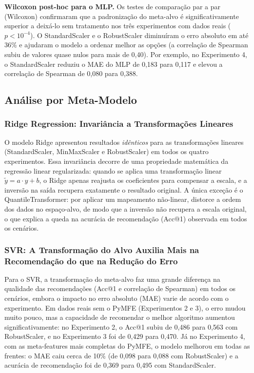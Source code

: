 \documentclass[12pt]{article}
\begin{document}
\textbf{Wilcoxon post-hoc para o MLP.} Os testes de comparação par a par (Wilcoxon) confirmaram que a padronização do meta-alvo é significativamente superior a deixá-lo sem tratamento nos três experimentos com dados reais ($p < 10^{-4}$). O StandardScaler e o RobustScaler diminuíram o erro absoluto em até 36\% e ajudaram o modelo a ordenar melhor as opções (a correlação de Spearman subiu de valores quase nulos para mais de 0,40). Por exemplo, no Experimento 4, o StandardScaler reduziu o MAE do MLP de 0,183 para 0,117 e elevou a correlação de Spearman de 0,080 para 0,388.

\subsection{Análise por Meta-Modelo}

\subsubsection{Ridge Regression: Invariância a Transformações Lineares}

O modelo Ridge apresentou resultados \textit{idênticos} para as transformações lineares (StandardScaler, MinMaxScaler e RobustScaler) em todos os quatro experimentos. Essa invariância decorre de uma propriedade matemática da regressão linear regularizada: quando se aplica uma transformação linear $\tilde{y} = a \cdot y + b$, o Ridge apenas reajusta os coeficientes para compensar a escala, e a inversão na saída recupera exatamente o resultado original. A única exceção é o QuantileTransformer: por aplicar um mapeamento não-linear, distorce a ordem dos dados no espaço-alvo, de modo que a inversão não recupera a escala original, o que explica a queda na acurácia de recomendação (Acc@1) observada em todos os cenários.

\subsubsection{SVR: A Transformação do Alvo Auxilia Mais na Recomendação do que na Redução do Erro}

Para o SVR, a transformação do meta-alvo faz uma grande diferença na qualidade das recomendações (Acc@1 e correlação de Spearman) em todos os cenários, embora o impacto no erro absoluto (MAE) varie de acordo com o experimento. Em dados reais sem o PyMFE (Experimentos 2 e 3), o erro mudou muito pouco, mas a capacidade de recomendar o melhor algoritmo aumentou significativamente: no Experimento 2, o Acc@1 subiu de 0,486 para 0,563 com RobustScaler, e no Experimento 3 foi de 0,429 para 0,470. Já no Experimento 4, com as meta-features mais completas do PyMFE, o modelo melhorou em todas as frentes: o MAE caiu cerca de 10\% (de 0,098 para 0,088 com RobustScaler) e a acurácia de recomendação foi de 0,369 para 0,495 com StandardScaler. 
\end{document}
